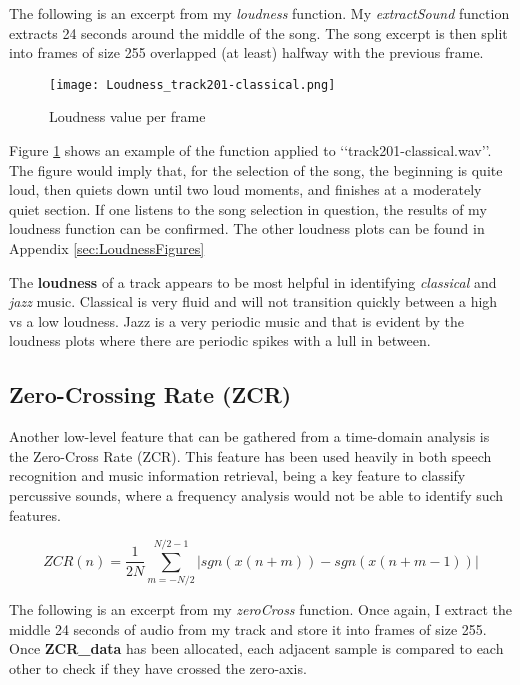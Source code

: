 \documentclass{article} %
\begin{document}
The following is an excerpt from my \emph{loudness} function. My \emph{extractSound} function extracts 24 seconds around the middle of the song. 
The song excerpt is then split into frames of size 255 overlapped (at least) halfway with the previous frame. 




\begin{figure}[h]
\centering
\texttt{[image: Loudness\_track201-classical.png]}
\caption{Loudness value per frame}
\label{fig:loudness}
\end{figure}

Figure \ref{fig:loudness} shows an example of the function applied to \lq\lq{}track201-classical.wav\rq\rq{}. The figure would imply that, for the selection  of the song, the beginning is quite 
loud, then quiets down until two loud moments, and finishes at a moderately quiet section. If one listens to the song selection in question, the results of my loudness function can be
confirmed. The other loudness plots can be found in Appendix \ref{sec:LoudnessFigures}

The \textbf{loudness} of a track appears to be most helpful in identifying \emph{classical} and \emph{jazz} music. 
Classical is very fluid and will not transition quickly between a high vs a low loudness. 
Jazz is a very periodic music and that is evident by the loudness plots where there are periodic spikes with a lull in between. 


\subsection{Zero-Crossing Rate (ZCR)}

Another low-level feature that can be gathered from a time-domain analysis is the Zero-Cross Rate (ZCR). This feature has been used heavily in both speech recognition and music 
information retrieval, being a key feature to classify percussive sounds, where a frequency analysis would not be able to identify such features. 

\begin{equation}\label{eq:ZCR}
ZCR(n)=\frac{1}{2N}\sum\limits_{m=-N/2}^{N/2-1}|sgn(x(n+m))-sgn(x(n+m-1))|
\end{equation}

The following is an excerpt from my \emph{zeroCross} function. Once again, I extract the middle 24 seconds of audio from my track and store it into frames of size 255. 
Once \textbf{ZCR\_data} has been allocated, each adjacent sample is compared to each other to check if they have crossed the zero-axis. 
\end{document}
